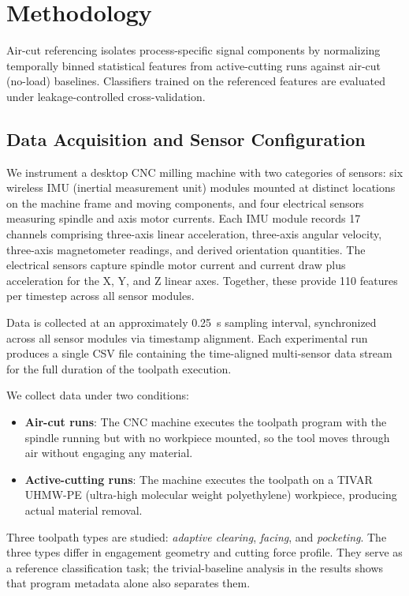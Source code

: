 \section{Methodology}\label{sec:methodology}

Air-cut referencing isolates process-specific signal components by normalizing temporally binned statistical features from active-cutting runs against air-cut (no-load) baselines. Classifiers trained on the referenced features are evaluated under leakage-controlled cross-validation.

\subsection{Data Acquisition and Sensor Configuration}\label{sec:data_acquisition}

We instrument a desktop CNC milling machine with two categories of sensors: six wireless IMU (inertial measurement unit) modules mounted at distinct locations on the machine frame and moving components, and four electrical sensors measuring spindle and axis motor currents. Each IMU module records 17 channels comprising three-axis linear acceleration, three-axis angular velocity, three-axis magnetometer readings, and derived orientation quantities. The electrical sensors capture spindle motor current and current draw plus acceleration for the X, Y, and Z linear axes. Together, these provide 110 features per timestep across all sensor modules.

Data is collected at an approximately \SI{0.25}{\second} sampling interval, synchronized across all sensor modules via timestamp alignment. Each experimental run produces a single CSV file containing the time-aligned multi-sensor data stream for the full duration of the toolpath execution.

We collect data under two conditions:
\begin{itemize}
    \item \textbf{Air-cut runs}: The CNC machine executes the toolpath program with the spindle running but with no workpiece mounted, so the tool moves through air without engaging any material.
    \item \textbf{Active-cutting runs}: The machine executes the toolpath on a TIVAR UHMW-PE (ultra-high molecular weight polyethylene) workpiece, producing actual material removal.
\end{itemize}

Three toolpath types are studied: \emph{adaptive clearing}, \emph{facing}, and \emph{pocketing}. The three types differ in engagement geometry and cutting force profile. They serve as a reference classification task; the trivial-baseline analysis in the results shows that program metadata alone also separates them.

